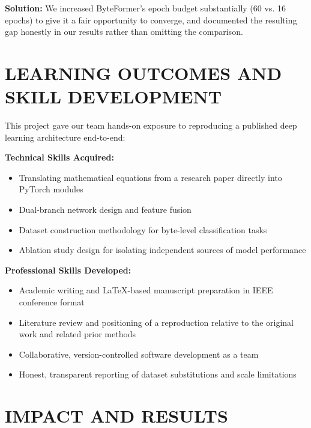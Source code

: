 \documentclass[conference]{IEEEtran}
\begin{document}
{\textbf{Solution:} We increased ByteFormer's epoch budget substantially (60 vs. 16 epochs) to give it a fair opportunity to converge, and documented the resulting gap honestly in our results rather than omitting the comparison.

\section{LEARNING OUTCOMES AND SKILL DEVELOPMENT}

This project gave our team hands-on exposure to reproducing a published deep learning architecture end-to-end:

\textbf{Technical Skills Acquired:}
\begin{itemize}[leftmargin=1em, itemsep=0pt]
\item Translating mathematical equations from a research paper directly into PyTorch modules
\item Dual-branch network design and feature fusion
\item Dataset construction methodology for byte-level classification tasks
\item Ablation study design for isolating independent sources of model performance
\end{itemize}

\textbf{Professional Skills Developed:}
\begin{itemize}[leftmargin=1em, itemsep=0pt]
\item Academic writing and \LaTeX-based manuscript preparation in IEEE conference format
\item Literature review and positioning of a reproduction relative to the original work and related prior methods
\item Collaborative, version-controlled software development as a team
\item Honest, transparent reporting of dataset substitutions and scale limitations
\end{itemize}

\section{IMPACT AND RESULTS}

}
\end{document}
